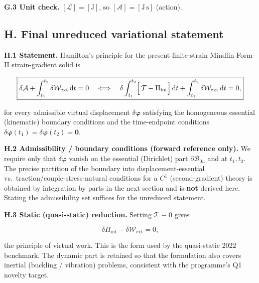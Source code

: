 \documentclass[11pt]{article}
\begin{document}
\textbf{G.3 Unit check.} $[\mathcal{L}]=[\mathrm{J}]$, so $[\mathcal{A}]=[\mathrm{J\,s}]$ (action). \checkmark

\subsection{H. Final unreduced variational statement}

\textbf{H.1 Statement.} Hamilton's principle for the present finite-strain Mindlin Form-II strain-gradient solid is

\begin{equation}
\boxed{
\delta\mathcal{A}
+ \int_{t_{1}}^{t_{2}}\delta\mathcal{W}_{\mathrm{ext}}\,\mathrm{d}t = 0
\quad\Longleftrightarrow\quad
\delta\int_{t_{1}}^{t_{2}}
\Bigl[\,\mathcal{T}-\Pi_{\mathrm{int}}\Bigr]\,\mathrm{d}t
+ \int_{t_{1}}^{t_{2}}\delta\mathcal{W}_{\mathrm{ext}}\,\mathrm{d}t = 0,
}
\label{rn:Hamiltoneq}
\end{equation}

for every admissible virtual displacement $\delta\boldsymbol{\varphi}$ satisfying the homogeneous essential (kinematic) boundary conditions and the time-endpoint conditions $\delta\boldsymbol{\varphi}(t_{1})=\delta\boldsymbol{\varphi}(t_{2})=\mathbf{0}$.

\textbf{H.2 Admissibility / boundary conditions (forward reference only).} We require only that $\delta\boldsymbol{\varphi}$ vanish on the essential (Dirichlet) part $\partial\mathcal{B}_{0u}$ and at $t_{1},t_{2}$. The precise partition of the boundary into displacement-essential vs.\ traction/couple-stress-natural conditions for a $C^{1}$ (second-gradient) theory is obtained by integration by parts in the next section and is \textbf{not} derived here. Stating the admissibility set suffices for the unreduced statement.

\textbf{H.3 Static (quasi-static) reduction.} Setting $\mathcal{T}\equiv 0$ gives

\begin{equation}
\delta\Pi_{\mathrm{int}}-\delta\mathcal{W}_{\mathrm{ext}}=0,
\label{rn:static}
\end{equation}

the principle of virtual work. This is the form used by the quasi-static 2022 benchmark. The dynamic part is retained so that the formulation also covers inertial (buckling / vibration) problems, consistent with the programme's Q1 novelty target.
\end{document}

